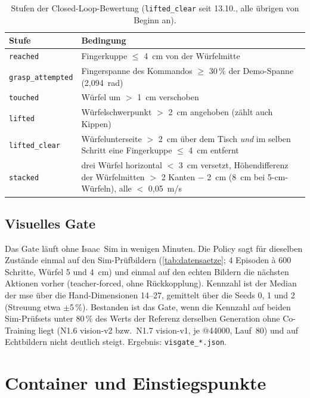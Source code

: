 \begin{table}[htb]
  \centering
  \begin{tabularx}{\linewidth}{lX}
    \toprule
    Stufe & Bedingung \\
    \midrule
    \texttt{reached} & Fingerkuppe $\le$ 4~cm von der Würfelmitte \\
    \texttt{grasp\_attempted} & Fingerspanne des Kommandos $\ge$ 30\,\% der Demo-Spanne
      (2,094~rad) \\
    \texttt{touched} & Würfel um $>$ 1~cm verschoben \\
    \texttt{lifted} & Würfelschwerpunkt $>$ 2~cm angehoben (zählt auch Kippen) \\
    \texttt{lifted\_clear} & Würfelunterseite $>$ 2~cm über dem Tisch \emph{und} im selben
      Schritt eine Fingerkuppe $\le$ 4~cm entfernt \\
    \texttt{stacked} & drei Würfel horizontal $<$ 3~cm versetzt, Höhendifferenz der
      Würfelmitten $>$ 2 Kanten $-$ 2~cm (8~cm bei 5-cm-Würfeln), alle $<$ 0,05~m/s \\
    \bottomrule
  \end{tabularx}
  \caption[Stufen der Closed-Loop-Bewertung]{Stufen der Closed-Loop-Bewertung
    (\texttt{lifted\_clear} seit 13.10., alle übrigen von Beginn an).}
  \label{tab:if-stufen}
\end{table}

\subsection{Visuelles Gate}
\label{sec:if-sim-gate}

Das Gate läuft ohne Isaac~Sim in wenigen Minuten. Die Policy sagt für dieselben Zustände
einmal auf den Sim-Prüfbildern (\cref{tab:datensaetze}; 4 Episoden à 600 Schritte, Würfel 5
und 4~cm) und einmal auf den echten Bildern die nächsten Aktionen vorher (teacher-forced,
ohne Rückkopplung). Kennzahl ist der Median der \ac{mse} über die
Hand-Dimensionen 14--27, gemittelt über die Seeds 0, 1 und 2 (Streuung etwa $\pm$5\,\%).
Bestanden ist das Gate, wenn die Kennzahl auf beiden Sim-Prüfsets unter 80\,\% des Werts der
Referenz derselben Generation ohne Co-Training liegt (N1.6 vision-v2 bzw.\ N1.7 vision-v1, je
@44000, Lauf~80) und auf Echtbildern nicht deutlich steigt. Ergebnis:
\texttt{visgate\_*.json}.

\section{Container und Einstiegspunkte}
\label{sec:if-container}
\label{sec:docker}

